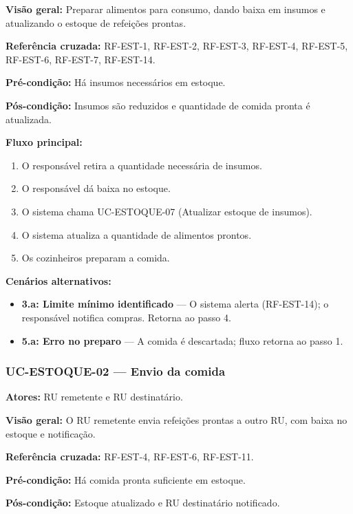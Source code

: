 \documentclass[12pt,a4paper]{article}
\begin{document}
\textbf{Visão geral:} Preparar alimentos para consumo, dando baixa em insumos e atualizando o estoque de refeições prontas.  

\textbf{Referência cruzada:} RF-EST-1, RF-EST-2, RF-EST-3, RF-EST-4, RF-EST-5, RF-EST-6, RF-EST-7, RF-EST-14.  

\textbf{Pré-condição:} Há insumos necessários em estoque.  

\textbf{Pós-condição:} Insumos são reduzidos e quantidade de comida pronta é atualizada.  

\textbf{Fluxo principal:}
\begin{enumerate}
    \item O responsável retira a quantidade necessária de insumos.
    \item O responsável dá baixa no estoque.
    \item O sistema chama UC-ESTOQUE-07 (Atualizar estoque de insumos).
    \item O sistema atualiza a quantidade de alimentos prontos.
    \item Os cozinheiros preparam a comida.
\end{enumerate}

\textbf{Cenários alternativos:}
\begin{itemize}
    \item \textbf{3.a: Limite mínimo identificado} — O sistema alerta (RF-EST-14); o responsável notifica compras. Retorna ao passo 4.
    \item \textbf{5.a: Erro no preparo} — A comida é descartada; fluxo retorna ao passo 1.
\end{itemize}

\subsubsection{UC-ESTOQUE-02 — Envio da comida}
\textbf{Atores:} RU remetente e RU destinatário.  

\textbf{Visão geral:} O RU remetente envia refeições prontas a outro RU, com baixa no estoque e notificação.  

\textbf{Referência cruzada:} RF-EST-4, RF-EST-6, RF-EST-11.  

\textbf{Pré-condição:} Há comida pronta suficiente em estoque.  

\textbf{Pós-condição:} Estoque atualizado e RU destinatário notificado.  
\end{document}
